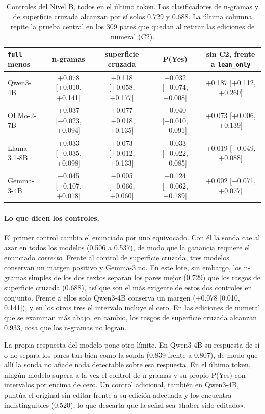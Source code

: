 \documentclass[10pt]{article}
\newcommand{\vr}[1]{\texttt{#1}}
\newcommand{\ic}[2]{[#1,\,#2]}
\begin{document}
\begin{table}[h]
\centering
\caption{Controles del Nivel B, todos en el último token. Los clasificadores de n-gramas y de superficie cruzada alcanzan por sí solos 0.729 y 0.688. La última columna repite la prueba central en los 309 pares que quedan al retirar las
ediciones de numeral (C2).}
\label{tab:bcontroles}
\vspace{2pt}
{\footnotesize\setlength{\tabcolsep}{3pt}
\begin{tabular}{@{}lcccc@{}}
\toprule
\vr{full} menos & n-gramas & superficie cruzada & P(Yes) & sin C2, frente a \vr{lean\_only}\\
\midrule
Qwen3-4B     & +0.078 [+0.010, +0.141] & +0.118 [+0.058, +0.177] & −0.032 [−0.074, +0.008] & +0.187 [+0.112, +0.260]\\
OLMo-2-7B    & +0.037 [−0.023, +0.094] & +0.077 [+0.018, +0.135] & +0.040 [−0.010, +0.091] & +0.073 [+0.006, +0.139]\\
Llama-3.1-8B & +0.033 [−0.035, +0.098] & +0.073 [+0.012, +0.133] & +0.033 [−0.022, +0.085] & +0.019 [−0.049, +0.088]\\
Gemma-3-4B   & −0.045 [−0.107, +0.018] & −0.005 [−0.066, +0.060] & +0.124 [+0.062, +0.189] & +0.002 [−0.071, +0.077]\\
\bottomrule
\end{tabular}}
\end{table}

\paragraph{Lo que dicen los controles.}
El primer control cambia el enunciado por uno equivocado. Con él la sonda cae al azar en todos los modelos (0.506 a
0.537), de modo que la ganancia requiere el enunciado \emph{correcto}. Frente al control de superficie cruzada, tres
modelos conservan un margen positivo y Gemma-3 no. En este lote, sin embargo, los n-gramas simples de los dos textos
separan los pares mejor (0.729) que los rasgos de superficie cruzada (0.688), así que son el más exigente de estos dos controles
en conjunto. Frente a ellos solo Qwen3-4B conserva un margen (+0.078 \ic{0.010}{0.141}), y en los otros tres el
intervalo incluye el cero. En las ediciones de numeral que se examinan más abajo, en cambio, los rasgos de
superficie cruzada alcanzan 0.933, cosa que los n-gramas no logran.

La propia respuesta del modelo pone otro límite. En Qwen3-4B su respuesta de sí o no separa los pares tan bien como
la sonda (0.839 frente a 0.807), de modo que allí la sonda no añade nada detectable sobre esa respuesta. En el
último token, ningún modelo supera a la vez el control de n-gramas y su propio P(Yes) con intervalos por encima de
cero. Un control adicional, también en Qwen3-4B, puntúa el original sin editar frente a su edición adecuada y los
encuentra indistinguibles (0.520), lo que descarta que la señal sea «haber sido editado».
\end{document}
